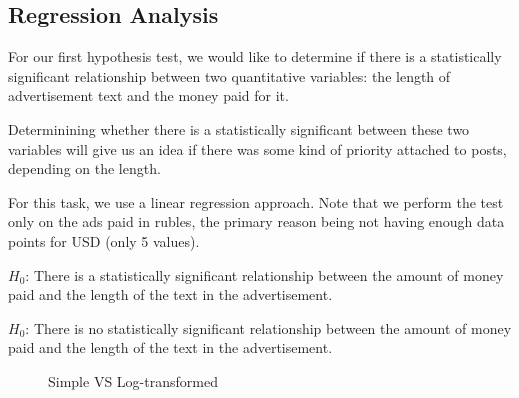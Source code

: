\documentclass[12pt]{article}
\theoremstyle{definition}
\begin{document}

\subsection*{\centering Regression Analysis}

For our first hypothesis test, we would like to determine if there is a
statistically significant relationship between two quantitative variables:
the length of advertisement text and the money paid for it.

\bigskip

Determinining whether there is a statistically significant between these two
variables will give us an idea if there was some kind of priority attached
to posts, depending on the length.

\bigskip

For this task, we use a linear regression approach. Note that we perform the
test only on the ads paid in rubles, the primary reason being not having enough
data points for USD (only 5 values).

\bigskip

$H_0$: There is a statistically significant relationship between the amount
of money paid and the length of the text in the advertisement.

\bigskip

$H_0$: There is no statistically significant relationship between the amount
of money paid and the length of the text in the advertisement.

\begin{figure}
  \centering
  \hfill
  \caption*{Simple VS Log-transformed}
  \label{fig:example}
\end{figure}
\end{document}
